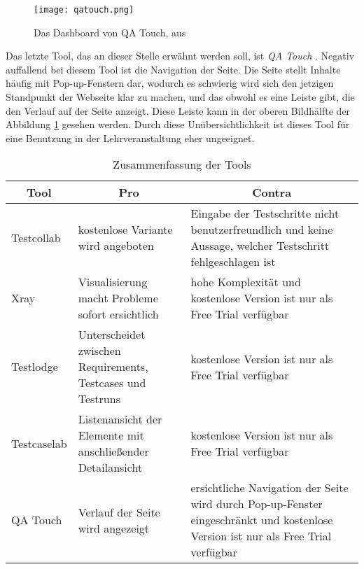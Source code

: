 \documentclass[11pt,a4paper]{report}
\begin{document}



\begin{figure}[htpb]
  \centering
  \texttt{[image: qatouch.png]}
  \caption{Das Dashboard von QA Touch, aus \cite{qatouch}}
  \label{f:qatouch}
\end{figure}


Das letzte Tool, das an dieser Stelle erwähnt werden soll, ist \textit{QA Touch} \cite{qatouch}. Negativ auffallend bei diesem Tool ist die Navigation der Seite. Die Seite stellt Inhalte häufig mit Pop-up-Fenstern dar, wodurch es schwierig wird sich den jetzigen Standpunkt der Webseite klar zu machen, und das obwohl es eine Leiste gibt, die den Verlauf auf der Seite anzeigt. Diese Leiste kann in der oberen Bildhälfte der Abbildung \ref{f:qatouch} gesehen werden. Durch diese Unübersichtlichkeit ist dieses Tool für eine Benutzung in der Lehrveranstaltung eher ungeeignet.










\begin{table}[htpb]
\caption{Zusammenfassung der Tools}
\begin{center}
\begin{tabular}{|p{}|p{}|p{}|}
    \hline
    \multicolumn{1}{|c|}{\textbf{Tool}} & 
	\multicolumn{1}{|c|}{\textbf{Pro}}& 
	\multicolumn{1}{|c|}{\textbf{Contra}} \\
    \hline
    Testcollab & kostenlose Variante wird angeboten & Eingabe der Testschritte nicht benutzerfreundlich und keine Aussage, welcher Testschritt fehlgeschlagen ist \\
    \hline
    Xray & Visualisierung macht Probleme sofort ersichtlich & hohe Komplexität und kostenlose Version ist nur als Free Trial verfügbar \\
    \hline
    Testlodge & Unterscheidet zwischen Requirements, Testcases und Testruns & kostenlose Version ist nur als Free Trial verfügbar\\
    \hline
    Testcaselab & Listenansicht der Elemente mit anschließender Detailansicht & kostenlose Version ist nur als Free Trial verfügbar \\
    \hline
    QA Touch & Verlauf der Seite wird angezeigt & ersichtliche Navigation der Seite wird durch Pop-up-Fenster eingeschränkt und kostenlose Version ist nur als Free Trial verfügbar\\
	\hline
	
\end{tabular}
\end{center}
\label{t:zusammenfassung}
\end{table}
\end{document}

